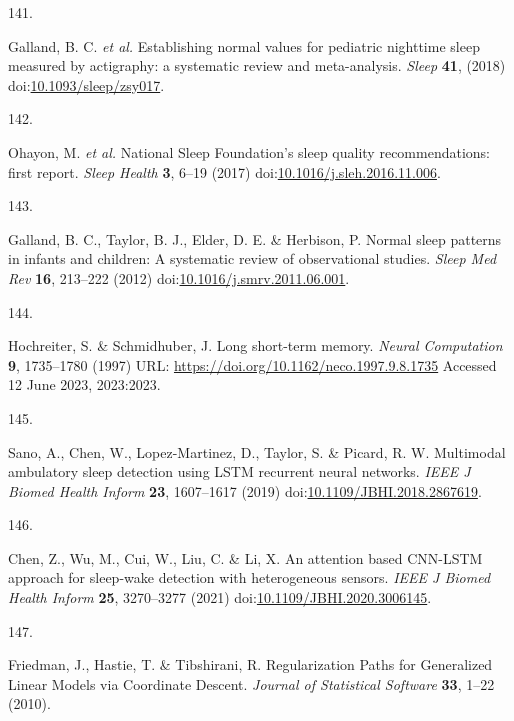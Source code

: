 \documentclass[
  10pt,
]{scrbook}
\newlength{\cslhangindent}
\newlength{\csllabelwidth}
\newlength{\cslentryspacingunit} %
\newenvironment{CSLReferences}[2] %
 {%
  \setlength{\parindent}{0pt}
  \ifodd #1
  \let\oldpar\par
  \def\par{\hangindent=\cslhangindent\oldpar}
  \fi
  \setlength{\parskip}{#2\cslentryspacingunit}
 }%
 {}
\newcommand{\CSLLeftMargin}[1]{\parbox[t]{\csllabelwidth}{#1}}
\newcommand{\CSLRightInline}[1]{\parbox[t]{\linewidth - \csllabelwidth}{#1}\break}
\begin{document}
\begin{CSLReferences}{0}{0}
\leavevmode{}%
\CSLLeftMargin{141. }%
\CSLRightInline{Galland, B. C. \emph{et al.} Establishing normal values
for pediatric nighttime sleep measured by actigraphy: a systematic
review and meta-analysis. \emph{Sleep} \textbf{41}, (2018)
doi:\href{https://doi.org/10.1093/sleep/zsy017}{10.1093/sleep/zsy017}.}

\leavevmode{}%
\CSLLeftMargin{142. }%
\CSLRightInline{Ohayon, M. \emph{et al.} National Sleep Foundation's
sleep quality recommendations: first report. \emph{Sleep Health}
\textbf{3}, 6--19 (2017)
doi:\href{https://doi.org/10.1016/j.sleh.2016.11.006}{10.1016/j.sleh.2016.11.006}.}

\leavevmode{}%
\CSLLeftMargin{143. }%
\CSLRightInline{Galland, B. C., Taylor, B. J., Elder, D. E. \& Herbison,
P. Normal sleep patterns in infants and children: A systematic review of
observational studies. \emph{Sleep Med Rev} \textbf{16}, 213--222 (2012)
doi:\href{https://doi.org/10.1016/j.smrv.2011.06.001}{10.1016/j.smrv.2011.06.001}.}

\leavevmode{}%
\CSLLeftMargin{144. }%
\CSLRightInline{Hochreiter, S. \& Schmidhuber, J. Long short-term
memory. \emph{Neural Computation} \textbf{9}, 1735--1780 (1997) URL:
\url{https://doi.org/10.1162/neco.1997.9.8.1735} Accessed 12 June 2023,
2023:2023.}

\leavevmode{}%
\CSLLeftMargin{145. }%
\CSLRightInline{Sano, A., Chen, W., Lopez-Martinez, D., Taylor, S. \&
Picard, R. W. Multimodal ambulatory sleep detection using {LSTM}
recurrent neural networks. \emph{{IEEE} J Biomed Health Inform}
\textbf{23}, 1607--1617 (2019)
doi:\href{https://doi.org/10.1109/JBHI.2018.2867619}{10.1109/JBHI.2018.2867619}.}

\leavevmode{}%
\CSLLeftMargin{146. }%
\CSLRightInline{Chen, Z., Wu, M., Cui, W., Liu, C. \& Li, X. An
attention based {CNN}-{LSTM} approach for sleep-wake detection with
heterogeneous sensors. \emph{{IEEE} J Biomed Health Inform} \textbf{25},
3270--3277 (2021)
doi:\href{https://doi.org/10.1109/JBHI.2020.3006145}{10.1109/JBHI.2020.3006145}.}

\leavevmode{}%
\CSLLeftMargin{147. }%
\CSLRightInline{Friedman, J., Hastie, T. \& Tibshirani, R.
Regularization Paths for Generalized Linear Models via Coordinate
Descent. \emph{Journal of Statistical Software} \textbf{33}, 1--22
(2010).}


\end{CSLReferences}
\end{document}
